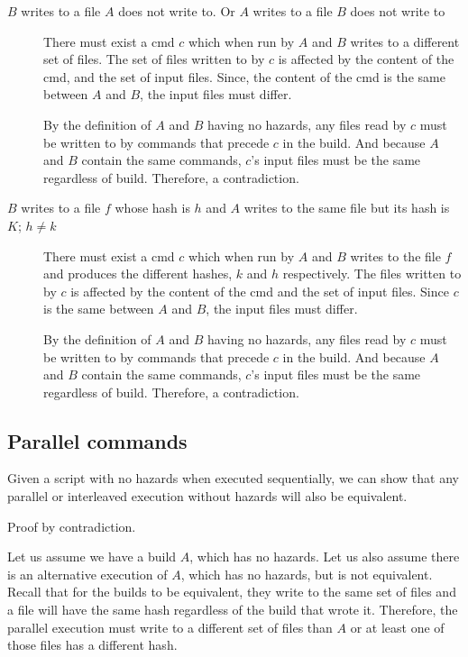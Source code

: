 \begin{description}
\item [$B$ writes to a file $A$ does not write to. Or $A$ writes to a file $B$ does not write to]
  There must exist a cmd $c$ which when run by $A$ and $B$ writes to a different set of files.  The set of files written to by $c$ is affected by the content of the cmd, and the set of input files.  Since, the content of the cmd is the same between $A$ and $B$, the input files must differ.

  By the definition of $A$ and $B$ having no hazards, any files read by $c$ must be written to by commands that precede $c$ in the build. And because $A$ and $B$ contain the same commands, $c$'s input files must be the same regardless of build.  Therefore, a contradiction.

\item [$B$ writes to a file $f$ whose hash is $h$ and $A$ writes to the same file but its hash is $K$; $h \neq k$]
  There must exist a cmd $c$ which when run by $A$ and $B$ writes to the file $f$ and produces the different hashes, $k$ and $h$ respectively.  The files written to by $c$ is affected by the content of the cmd and the set of input files. Since $c$ is the same between $A$ and $B$, the input files must differ.

  By the definition of $A$ and $B$ having no hazards, any files read by $c$ must be written to by commands that precede $c$ in the build.  And because $A$ and $B$ contain the same commands, $c$'s input files must be the same regardless of build.  Therefore, a contradiction.

\end{description}

\subsection{Parallel commands}
\label{sec:proof:parallel}

Given a script with no hazards when executed sequentially, we can show that any parallel or interleaved execution without hazards will also be equivalent.

Proof by contradiction.

Let us assume we have a build $A$, which has no hazards.  Let us also assume there is an alternative execution of $A$, which has no hazards, but is not equivalent.
Recall that for the builds to be equivalent, they write to the same set of files and a file will have the same hash regardless of the build that wrote it.
Therefore, the parallel execution must write to a different set of files than $A$ or at least one of those files has a different hash.

